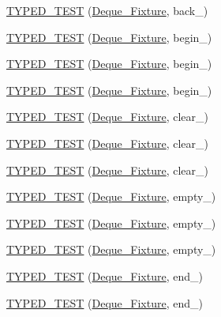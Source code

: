 \begin{DoxyCompactItemize}
\item 
\hyperlink{TestDeque_8c_09_09_a95fd6486eb983f6dc1b1e15f26cd3e3f}{T\-Y\-P\-E\-D\-\_\-\-T\-E\-S\-T} (\hyperlink{structDeque__Fixture}{Deque\-\_\-\-Fixture}, back\-\_)
\item 
\hyperlink{TestDeque_8c_09_09_a10dac587810af7089eadd6154c816755}{T\-Y\-P\-E\-D\-\_\-\-T\-E\-S\-T} (\hyperlink{structDeque__Fixture}{Deque\-\_\-\-Fixture}, begin\-\_)
\item 
\hyperlink{TestDeque_8c_09_09_a1132e2cec1b7013347c7c498efb24b72}{T\-Y\-P\-E\-D\-\_\-\-T\-E\-S\-T} (\hyperlink{structDeque__Fixture}{Deque\-\_\-\-Fixture}, begin\-\_)
\item 
\hyperlink{TestDeque_8c_09_09_a439d4dcf7124f21a29c7baa352367bb2}{T\-Y\-P\-E\-D\-\_\-\-T\-E\-S\-T} (\hyperlink{structDeque__Fixture}{Deque\-\_\-\-Fixture}, begin\-\_)
\item 
\hyperlink{TestDeque_8c_09_09_a395cc403aa20b668a730b460aa4aa7b6}{T\-Y\-P\-E\-D\-\_\-\-T\-E\-S\-T} (\hyperlink{structDeque__Fixture}{Deque\-\_\-\-Fixture}, clear\-\_)
\item 
\hyperlink{TestDeque_8c_09_09_aa0d3464fabf7b417a0cc29a41622bb26}{T\-Y\-P\-E\-D\-\_\-\-T\-E\-S\-T} (\hyperlink{structDeque__Fixture}{Deque\-\_\-\-Fixture}, clear\-\_)
\item 
\hyperlink{TestDeque_8c_09_09_a87453c691b21177a35d2d4115cc89e41}{T\-Y\-P\-E\-D\-\_\-\-T\-E\-S\-T} (\hyperlink{structDeque__Fixture}{Deque\-\_\-\-Fixture}, clear\-\_)
\item 
\hyperlink{TestDeque_8c_09_09_a43dba564190a6f107681362f185f89fa}{T\-Y\-P\-E\-D\-\_\-\-T\-E\-S\-T} (\hyperlink{structDeque__Fixture}{Deque\-\_\-\-Fixture}, empty\-\_)
\item 
\hyperlink{TestDeque_8c_09_09_a84f67cf33f9caabae1f10781fc19a3bf}{T\-Y\-P\-E\-D\-\_\-\-T\-E\-S\-T} (\hyperlink{structDeque__Fixture}{Deque\-\_\-\-Fixture}, empty\-\_)
\item 
\hyperlink{TestDeque_8c_09_09_a33b53309ce8dbdf2e2af8e33e96519dd}{T\-Y\-P\-E\-D\-\_\-\-T\-E\-S\-T} (\hyperlink{structDeque__Fixture}{Deque\-\_\-\-Fixture}, empty\-\_)
\item 
\hyperlink{TestDeque_8c_09_09_a63936d9adeed2f7de664841244fe9e8a}{T\-Y\-P\-E\-D\-\_\-\-T\-E\-S\-T} (\hyperlink{structDeque__Fixture}{Deque\-\_\-\-Fixture}, end\-\_)
\item 
\hyperlink{TestDeque_8c_09_09_ad244e43e80459c62bca7627f808b953b}{T\-Y\-P\-E\-D\-\_\-\-T\-E\-S\-T} (\hyperlink{structDeque__Fixture}{Deque\-\_\-\-Fixture}, end\-\_)
\item 

\end{DoxyCompactItemize}
